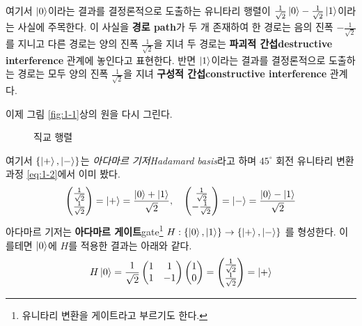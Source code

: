 \documentclass[a4paper,chapter,atbegshi]{oblivoir}
\begin{document}
 여기서 $\ket{0}$이라는 결과를 결정론적으로 도출하는 유니타리 행렬이 
 $\frac{1}{\sqrt2}\ket0-\frac{1}{\sqrt2}\ket{1}$이라는 사실에 주목한다.
 이 사실을 \textbf{경로\tiny
 path}가 두 개 존재하여 한 경로는 음의 진폭 $-\frac{1}{\sqrt2}$를 지니고 
 다른 경로는 양의 진폭 $\frac{1}{\sqrt2}$을 지녀 두 경로는 \textbf{파괴적
 간섭\tiny destructive interference} 관계에 놓인다고 표현한다. 
 반면 $\ket{1}$이라는 결과를 결정론적으로 도출하는 경로는 모두 양의 진폭
 $\frac{1}{\sqrt2}$을 지녀 \textbf{구성적 간섭\tiny constructive interference}
 관계다.

 이제 그림 \ref{fig:1-1}상의 원을 다시 그린다.
\begin{figure}[h]
\begin{center}
  \caption{직교 행렬\label{fig:1-2}}
\end{center}
\end{figure}
여기서 $\{\ket+,\ket-\}$는 \emph{아다마르 기저\tiny Hadamard basis}라고 하며
$45^{\circ}$ 회전 유니타리 변환 과정 \ref{eq:1-2}에서 이미 봤다. 
\[
  \begin{pmatrix}\frac{1}{\sqrt2}\\\frac{1}{\sqrt2}\end{pmatrix}=\ket+ =
  \frac{\ket0+\ket1}{\sqrt2},\quad\begin{pmatrix}\frac{1}{\sqrt2}\\
  -\frac{1}{\sqrt2}\end{pmatrix} = \ket-=\frac{\ket0-\ket1}{\sqrt2}
\]
아다마르 기저는 \textbf{아다마르 게이트}{\tiny gate}\footnote{유니타리 변환을
게이트라고 부르기도 한다.} $H:\{\ket0,\ket1\} \rightarrow
\{\ket+,\ket-\}$ 를 형성한다. 이를테면 $\ket0$에 $H$를 적용한 결과는 아래와 같다.
\[
  H\ket0=\frac{1}{\sqrt2}\begin{pmatrix}1&1\\1&-1\end{pmatrix}
  \begin{pmatrix}1\\0\end{pmatrix} =
  \begin{pmatrix}\frac{1}{\sqrt2}\\\frac{1}{\sqrt2}\end{pmatrix}=\ket+
\]
\end{document}
